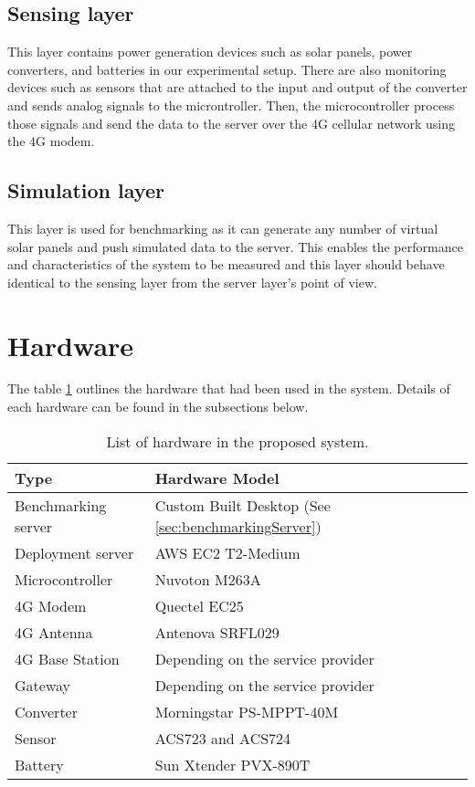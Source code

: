 \documentclass[../thesis.tex]{subfiles}
\begin{document}
\subsection{Sensing layer}

This layer contains power generation devices such as solar panels, power converters, and batteries in our experimental setup. There are also monitoring devices such as sensors that are attached to the input and output of the converter and sends analog signals to the microntroller. Then, the microcontroller process those signals and send the data to the server over the 4G cellular network using the 4G modem. 

\subsection{Simulation layer}

This layer is used for benchmarking as it can generate any number of virtual solar panels and push simulated data to the server. This enables the performance and characteristics of the system to be measured and this layer should behave identical to the sensing layer from the server layer's point of view.

\newpage
\section{Hardware}

The table \ref{tab:hardwareList} outlines the hardware that had been used in the system. Details of each hardware can be found in the subsections below. 

\begin{table}[h!]
	\begin{center}
		\caption{List of hardware in the proposed system.}
		\label{tab:hardwareList}
		\begin{tabular}{l|l}
			\toprule
			\textbf{Type} & \textbf{Hardware Model}\\
			\midrule
			Benchmarking server & Custom Built Desktop (See \autoref{sec:benchmarkingServer})\\
			Deployment server & AWS EC2 T2-Medium\\
			Microcontroller & Nuvoton M263A\\
			4G Modem & Quectel EC25\\
			4G Antenna & Antenova SRFL029\\
			4G Base Station & Depending on the service provider\\
			Gateway & Depending on the service provider\\
			Converter & Morningstar PS-MPPT-40M\\
			Sensor & ACS723 and ACS724\\
			Battery & Sun Xtender PVX-890T\\
			\bottomrule
		\end{tabular}
	\end{center}
\end{table}
\end{document}
